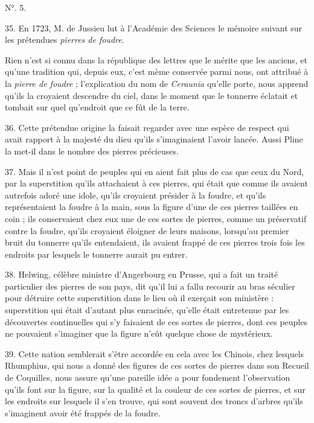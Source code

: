 \documentclass[a4paper, 11pt, oneside, polutonikogreek, french]{article}
\begin{document}
\begin{center}
N°. 5.
\end{center}

35. En 1723, M. de Jussieu lut à l'Académie des Sciences le mémoire suivant sur les prétendues \emph{pierres de foudre}.

Rien n'est si connu dans la république des lettres que le mérite que les anciens, et qu'une tradition qui, depuis eux, c’est mème conservée parmi nous, ont attribué à la \emph{pierre de foudre} ; l'explication du nom de \emph{Ceraunia} qu'elle porte, nous apprend qu'ils la croyaient descendre du ciel, dans le moment que le tonnerre éclatait et tombait sur quel qu’endroit que ce fût de la terre.

36. Cette prétendue origine la faisait regarder avec une espèce de respect qui avait rapport à la majesté du dieu qu'ils s'imaginaient l'avoir lancée. Aussi Pline la met-il dans le nombre des pierres précieuses.

37. Mais il n'est point de peuples qui en aient fait plus de cas que ceux du Nord, par la superstition qu'ils attachaient à ces pierres, qui était que comme ils avaient autrefois adoré une idole, qu'ils croyaient présider à la foudre, et qu'ils représentaient la foudre à la main, sous la figure d'une de ces pierres taillées en coin ; ils conservaient chez eux une de ces sortes de pierres, comme un préservatif contre la foudre, qu'ils croyaient éloigner de leurs maisons, lorsqu'au premier bruit du tonnerre qu'ils entendaient, ils avaient frappé de ces pierres trois fois les endroits par lesquels le tonnerre aurait pu entrer.

38. Helwing, célèbre ministre d'Angerbourg en Prusse, qui a fait un traité particulier des pierres de son pays, dit qu'il lui a fallu recourir au bras séculier pour détruire cette superstition dans le lieu où il exerçait son ministère : superstition qui était d'autant plus enracinée, qu'elle était entretenue par les découvertes continuelles qui s'y faisaient de ces sortes de pierres, dont ces peuples ne pouvaient s'imaginer que la figure n'eût quelque chose de mystérieux.

39. Cette nation semblerait s'être accordée en cela avec les Chinois, chez lesquels Rhumphius, qui nous a donné des figures de ces sortes de pierres dans son Recueil de Coquilles, nous assure qu'une pareille idée a pour fondement l'observation qu'ils font sur la figure, sur la qualité et la couleur de ces sortes de pierres, et sur les endroits sur lesquels il s'en trouve, qui sont souvent des troncs d'arbres qu'ils s'imaginent avoir été frappés de la foudre.
\end{document}
